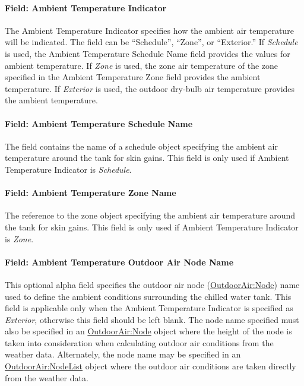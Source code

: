 \paragraph{Field: Ambient Temperature Indicator}\label{field-ambient-temperature-indicator}

The Ambient Temperature Indicator specifies how the ambient air temperature will be indicated. The field can be ``Schedule'', ``Zone'', or ``Exterior.'' If \emph{Schedule} is used, the Ambient Temperature Schedule Name field provides the values for ambient temperature. If \emph{Zone} is used, the zone air temperature of the zone specified in the Ambient Temperature Zone field provides the ambient temperature. If \emph{Exterior} is used, the outdoor dry-bulb air temperature provides the ambient temperature.

\paragraph{Field: Ambient Temperature Schedule Name}\label{field-ambient-temperature-schedule-name-000}

The field contains the name of a schedule object specifying the ambient air temperature around the tank for skin gains. This field is only used if Ambient Temperature Indicator is \emph{Schedule}.

\paragraph{Field: Ambient Temperature Zone Name}\label{field-ambient-temperature-zone-name-000}

The reference to the zone object specifying the ambient air temperature around the tank for skin gains. This field is only used if Ambient Temperature Indicator is \emph{Zone}.

\paragraph{Field: Ambient Temperature Outdoor Air Node Name}\label{field-ambient-temperature-outdoor-air-node-name}

This optional alpha field specifies the outdoor air node (\hyperref[outdoorairnode]{OutdoorAir:Node}) name used to define the ambient conditions surrounding the chilled water tank. This field is applicable only when the Ambient Temperature Indicator is specified as \emph{Exterior}, otherwise this field should be left blank. The node name specified must also be specified in an \hyperref[outdoorairnode]{OutdoorAir:Node} object where the height of the node is taken into consideration when calculating outdoor air conditions from the weather data. Alternately, the node name may be specified in an \hyperref[outdoorairnodelist]{OutdoorAir:NodeList} object where the outdoor air conditions are taken directly from the weather data.

